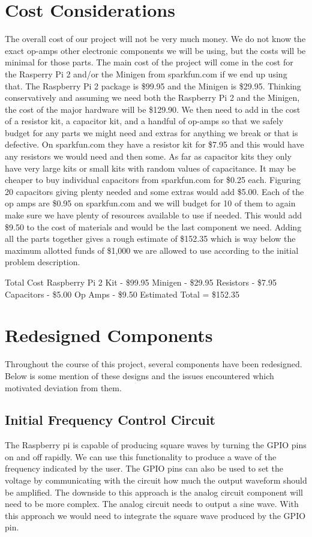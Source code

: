 \documentclass{article}	%
\begin{document}
\begin{multicols}{2}
\section{Cost Considerations}
The overall cost of our project will not be very much money. We do not know the exact op-amps other electronic components we will be using, but the costs will be minimal for those parts. The main cost of the project will come in the cost for the Rasperry Pi 2 and/or the Minigen from sparkfun.com if we end up using that. The Raspberry Pi 2 package is \$99.95 and the Minigen is \$29.95. Thinking conservatively and assuming we need both the Raspberry Pi 2 and the Minigen, the cost of the major hardware will be \$129.90. We then need to add in the cost of a resistor kit, a capacitor kit, and a handful of op-amps so that we safely budget for any parts we might need and extras for anything we break or that is defective. On sparkfun.com they have a resistor kit for \$7.95 and this would have any resistors we would need and then some. As far as capacitor kits they only have very large kits or small kits with random values of capacitance. It may be cheaper to buy individual capacitors from sparkfun.com for \$0.25 each. Figuring 20 capacitors giving plenty needed and some extras would add \$5.00. Each of the op amps are \$0.95 on sparkfun.com and we will budget for 10 of them to again make sure we have plenty of resources available to use if needed. This would add \$9.50 to the cost of materials and would be the last component we need. Adding all the parts together gives a rough estimate of \$152.35 which is way below the maximum allotted funds of \$1,000 we are allowed to use according to the initial problem description.

Total Cost
Raspberry Pi 2 Kit - \$99.95
Minigen - \$29.95
Resistors - \$7.95
Capacitors - \$5.00
Op Amps - \$9.50
Estimated Total = \$152.35

\section{Redesigned Components}
Throughout the course of this project,
several components have been redesigned.
Below is some mention of these designs and
the issues encountered which motivated deviation from them.

\subsection{Initial Frequency Control Circuit}
The Raspberry pi is capable of producing square waves by turning the GPIO pins on and off rapidly. We can use this functionality to produce a wave of the frequency indicated by the user. The GPIO pins can also be used to set the voltage by communicating with the circuit how much the output waveform should be amplified. The downside to this approach is the analog circuit component will need to be more complex. The analog circuit needs to output a sine wave. With this approach we would need to integrate the square wave produced by the GPIO pin.


\end{multicols}
\end{document}

